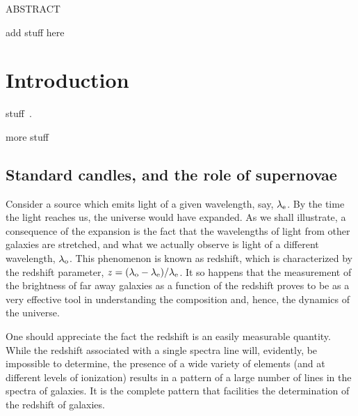 \documentclass[12pt,a4paper,oneside]{book}
\begin{document}
\newpage\topskip 40pt
\thispagestyle{empty}
\centerline{\Large ABSTRACT}
\vskip 20pt\noindent 
add stuff here


\newpage
\thispagestyle{empty}
\tableofcontents
\newpage




\chapter{Introduction}

stuff~\cite{cite}.

\par 

more stuff


\section{Standard candles, and the role of supernovae}

Consider a source which emits light of a given wavelength, say, $\lambda_{\rm
e}$.
By the time the light reaches us, the universe would have expanded.
As we shall illustrate, a consequence of the expansion is the fact that the
wavelengths of light from other galaxies are stretched, and what we actually 
observe is light of a different wavelength, $\lambda_{\rm o}$. 
This phenomenon is known as redshift, which is characterized by the redshift 
parameter, $z= (\lambda_{\rm o}-\lambda_{\rm e})/\lambda_{\rm e}$. 
It so happens that the measurement of the brightness of far away galaxies as 
a function of the redshift proves to be as a very effective tool in
understanding 
the composition and, hence, the dynamics of the universe.

\par

One should appreciate the fact the redshift is an easily measurable quantity.
While the redshift associated with a single spectra line will, evidently, be 
impossible to determine, the presence of a wide variety of elements (and at
different levels of ionization) results in a pattern of a large number of 
lines in the spectra of galaxies. It is the complete pattern that facilities 
the determination of the redshift of galaxies.
\end{document}
